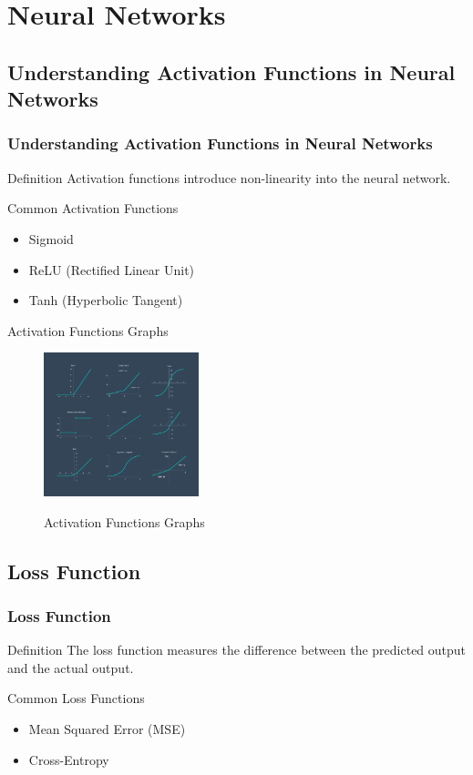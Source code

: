 \documentclass[aspectratio=169, hideothersubsections]{beamer}
\begin{document}
\section{Neural Networks}

\subsection{Understanding Activation Functions in Neural Networks}
\begin{frame}
    \frametitle{Understanding Activation Functions in Neural Networks}
    \begin{block}{Definition}
        Activation functions introduce non-linearity into the neural network.
    \end{block}
    \begin{block}{Common Activation Functions}
        \begin{itemize}
            \item Sigmoid
            \item ReLU (Rectified Linear Unit)
            \item Tanh (Hyperbolic Tangent)
        \end{itemize}
    \end{block}
\end{frame}

\begin{frame}{Activation Functions Graphs}
\begin{figure}
  \centering
  \includegraphics[width=0.4\textwidth]{pic.png}
  \label{fig:example}
  \caption{Activation Functions Graphs}
\end{figure}
\end{frame}

\subsection{Loss Function}
\begin{frame}
    \frametitle{Loss Function}
    \begin{block}{Definition}
        The loss function measures the difference between the predicted output and the actual output.
    \end{block}
    \begin{block}{Common Loss Functions}
        \begin{itemize}
            \item Mean Squared Error (MSE)
            \item Cross-Entropy
        \end{itemize}
    \end{block}
\end{frame}
\end{document}
